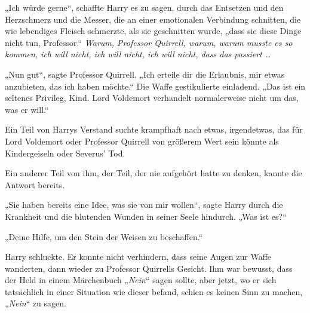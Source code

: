 „Ich würde gerne“, schaffte Harry es zu sagen, durch das Entsetzen und den Herzschmerz und die Messer, die an einer emotionalen Verbindung schnitten, die wie lebendiges Fleisch schmerzte, als sie geschnitten wurde, „dass sie diese Dinge nicht tun, Professor.“
\emph{Warum, Professor Quirrell, warum, warum musste es so kommen, ich will nicht, ich will nicht, ich will nicht, dass das passiert …}

„Nun gut“, sagte Professor Quirrell.
„Ich erteile dir die Erlaubnis, mir etwas anzubieten, das ich haben möchte.“
Die Waffe gestikulierte einladend.
„Das ist ein seltenes Privileg, Kind. Lord Voldemort verhandelt normalerweise nicht um das, was er will.“

Ein Teil von Harrys Verstand suchte krampfhaft nach etwas, irgendetwas, das für Lord Voldemort oder Professor Quirrell von größerem Wert sein könnte als Kindergeiseln oder Severus’ Tod.

Ein anderer Teil von ihm, der Teil, der nie aufgehört hatte zu denken, kannte die Antwort bereits.

„Sie haben bereits eine Idee, was sie von mir wollen“, sagte Harry durch die Krankheit und die blutenden Wunden in seiner Seele hindurch.
„Was ist es?“

„Deine Hilfe, um den Stein der Weisen zu beschaffen.“

Harry schluckte. Er konnte nicht verhindern, dass seine Augen zur Waffe wanderten, dann wieder zu Professor Quirrells Gesicht.
Ihm war bewusst, dass der Held in einem Märchenbuch
„\emph{Nein}“ sagen sollte, aber jetzt, wo er sich tatsächlich in einer Situation wie dieser befand, schien es keinen Sinn zu machen,
„\emph{Nein}“ zu sagen.

